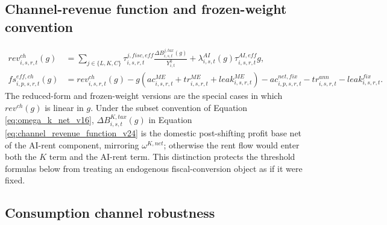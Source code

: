 \documentclass[11pt,a4paper]{article}
\begin{document}
\subsection{Channel-revenue function and frozen-weight convention}

\begin{equation}\label{eq:channel_revenue_function_v24}
\begin{split}
    rev^{ch}_{i,s,r,t}(g)
    &=\sum_{j\in\{L,K,C\}}\tau^{j,fisc,eff}_{i,s,r,t}\frac{\Delta B^{j,tax}_{i,s,t}(g)}{Y^0_{i,t}}
      +\lambda^{AI}_{i,s,t}(g)\tau^{AI,eff}_{i,s,r,t}g,\\
    fs^{eff,ch}_{i,p,s,r,t}(g)
    &=rev^{ch}_{i,s,r,t}(g)
      -g\left(ac^{ME}_{i,s,r,t}+tr^{ME}_{i,s,r,t}+leak^{ME}_{i,s,r,t}\right)
      -ac^{net,fix}_{i,p,s,r,t}-tr^{ann}_{i,s,r,t}-leak^{fix}_{i,s,r,t}.
\end{split}
\end{equation}
The reduced-form and frozen-weight versions are the special cases in which $rev^{ch}(g)$ is linear in $g$. Under the subset convention of Equation \eqref{eq:omega_k_net_v16}, $\Delta B^{K,tax}_{i,s,t}(g)$ in Equation \eqref{eq:channel_revenue_function_v24} is the domestic post-shifting profit base net of the AI-rent component, mirroring $\omega^{K,net}$; otherwise the rent flow would enter both the $K$ term and the AI-rent term. This distinction protects the threshold formulas below from treating an endogenous fiscal-conversion object as if it were fixed.

\subsection{Consumption channel robustness}
\end{document}
